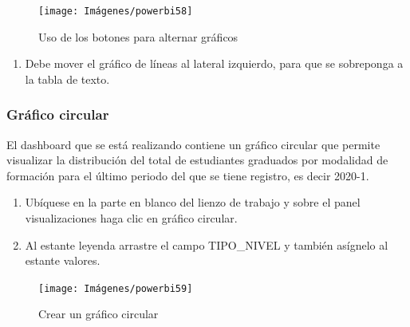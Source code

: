 \documentclass[
]{book}
\providecommand{\tightlist}{%
  \setlength{\itemsep}{0pt}\setlength{\parskip}{0pt}}
\begin{document}
\begin{figure}

{\centering \texttt{[image: Imágenes/powerbi58]} 

}

\caption{Uso de los botones para alternar gráficos}\label{fig:paso13alternancia-fig}
\end{figure}

\begin{enumerate}
\def\labelenumi{\arabic{enumi}.}
\setcounter{enumi}{13}
\tightlist
\item
  Debe mover el gráfico de líneas al lateral izquierdo, para que se sobreponga a la tabla de texto.
\end{enumerate}

\hypertarget{gruxe1fico-circular}{%
\subsubsection{Gráfico circular}\label{gruxe1fico-circular}}

El dashboard que se está realizando contiene un gráfico circular que permite visualizar la distribución del total de estudiantes graduados por modalidad de formación para el último periodo del que se tiene registro, es decir 2020-1.

\begin{enumerate}
\def\labelenumi{\arabic{enumi}.}
\item
  Ubíquese en la parte en blanco del lienzo de trabajo y sobre el panel visualizaciones haga clic en gráfico circular.
\item
  Al estante leyenda arrastre el campo TIPO\_NIVEL y también asígnelo al estante valores.
\end{enumerate}

\begin{figure}

{\centering \texttt{[image: Imágenes/powerbi59]} 

}

\caption{Crear un gráfico circular}\label{fig:paso2circular-fig}
\end{figure}
\end{document}
